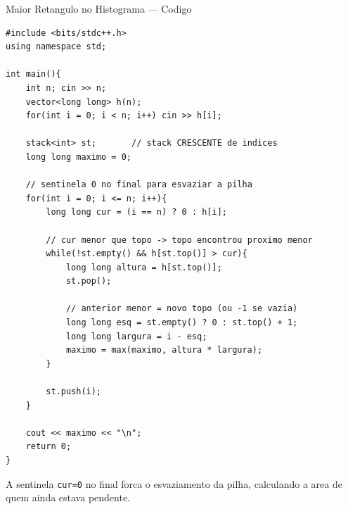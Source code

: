 \documentclass[aspectratio=169,11pt]{beamer}
\begin{document}
\begin{frame}[fragile,shrink=12]{Maior Retangulo no Histograma --- Codigo}
  \begin{tcolorbox}[caixaCodigo]
    \begin{lstlisting}[style=cppcompact]
#include <bits/stdc++.h>
using namespace std;

int main(){
    int n; cin >> n;
    vector<long long> h(n);
    for(int i = 0; i < n; i++) cin >> h[i];

    stack<int> st;       // stack CRESCENTE de indices
    long long maximo = 0;

    // sentinela 0 no final para esvaziar a pilha
    for(int i = 0; i <= n; i++){
        long long cur = (i == n) ? 0 : h[i];

        // cur menor que topo -> topo encontrou proximo menor
        while(!st.empty() && h[st.top()] > cur){
            long long altura = h[st.top()];
            st.pop();

            // anterior menor = novo topo (ou -1 se vazia)
            long long esq = st.empty() ? 0 : st.top() + 1;
            long long largura = i - esq;
            maximo = max(maximo, altura * largura);
        }

        st.push(i);
    }

    cout << maximo << "\n";
    return 0;
}
    \end{lstlisting}
  \end{tcolorbox}
  \vspace{0.05cm}
  \begin{tcolorbox}[caixaVerde,title={h = [2,1,5,6,2,3] --- Saida: 10}]
    \footnotesize
    A sentinela \texttt{cur=0} no final forca o esvaziamento da pilha,
    calculando a area de quem ainda estava pendente.
  \end{tcolorbox}
\end{frame}
\end{document}
